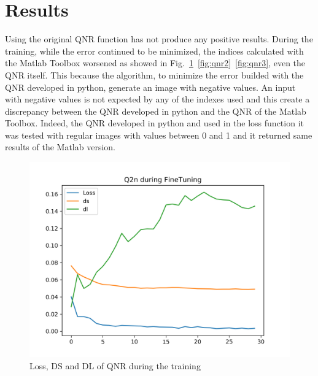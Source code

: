 \documentclass[12pt]{report}
\begin{document}
\section{Results}
Using the original QNR function has not produce any positive results.
During the training, while the error continued to be minimized, the indices calculated with the Matlab Toolbox worsened as showed in Fig.~\ref{fig:qnr1}~\ref{fig:qnr2}~\ref{fig:qnr3}, even the QNR itself.
This because the algorithm, to minimize the error builded with the QNR developed in python, generate an image with negative values.
An input with negative values is not expected by any of the indexes used and this create a discrepancy between the QNR developed in python and the QNR of the Matlab Toolbox.
Indeed, the QNR developed in python and used in the loss function it was tested with regular images with values between 0 and 1 and it returned same results of the Matlab version.


\begin{figure}[t]
    \centering
    \includegraphics[scale=.5]{qnr1.png}
    \caption{Loss, DS and DL of QNR during the training}
    \label{fig:qnr1}
\end{figure}
\end{document}
